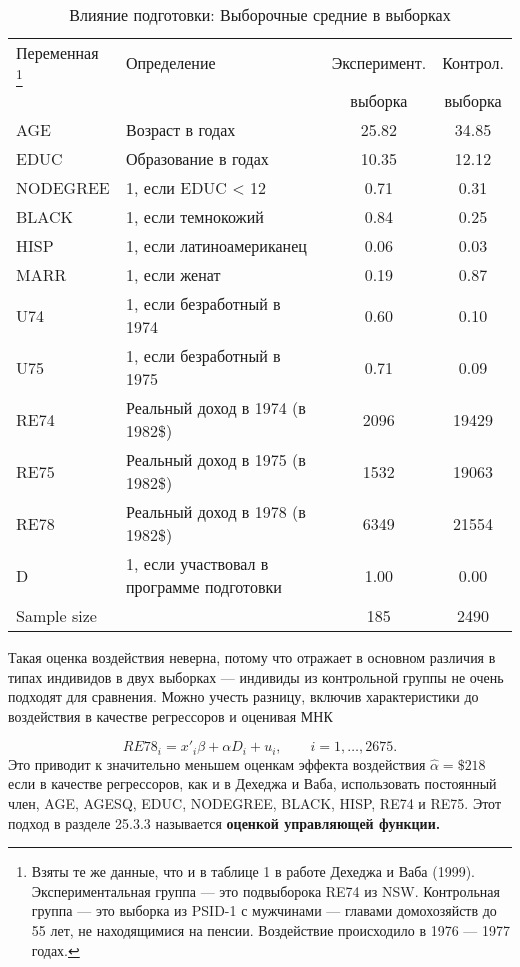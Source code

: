 \begin{table}
\caption{\label{tab: } Влияние подготовки: Выборочные средние в выборках}
\begin{minipage}{17.5cm}
\begin{center}
\begin{tabular}{llcc}
\hline
\hline
Переменная \footnote{Взяты те же данные, что и в таблице 1 в работе Дехеджа и Ваба (1999). Экспериментальная группа --- это подвыборока RE74 из NSW. Контрольная группа --- это выборка из PSID-1 с мужчинами --- главами домохозяйств до 55 лет, не находящимися на пенсии. Воздействие происходило в 1976 --- 1977 годах.} & Определение & Эксперимент. &  Контрол. \\
 & & выборка & выборка\\
\hline
AGE & Возраст в годах & 25.82 & 34.85 \\
EDUC & Образование в годах & 10.35 & 12.12 \\
NODEGREE & 1, если EDUC < 12 & 0.71 & 0.31 \\
BLACK & 1, если темнокожий & 0.84 & 0.25 \\
HISP & 1, если латиноамериканец & 0.06 & 0.03 \\
MARR & 1, если женат & 0.19 & 0.87 \\
U74 & 1, если безработный в 1974 & 0.60 & 0.10 \\
U75 & 1, если безработный в 1975 & 0.71 & 0.09 \\
RE74 & Реальный доход в 1974 (в 1982\$) & 2096 & 19429 \\
RE75 & Реальный доход в 1975 (в 1982\$) & 1532 & 19063 \\
RE78 & Реальный доход в 1978 (в 1982\$) & 6349 & 21554 \\
D & 1, если участвовал в программе подготовки & 1.00 & 0.00 \\
Sample size &  & 185 & 2490 \\
\hline
\hline
\end{tabular}
\end{center}
\end{minipage}
\end{table}

Такая оценка воздействия неверна, потому что отражает в основном различия в типах индивидов в двух выборках --- индивиды из контрольной группы не очень подходят для сравнения. Можно учесть разницу, включив характеристики до воздействия в качестве регрессоров и оценивая МНК

\begin{equation}
\label{eq25.76}
RE78_i = x'_i \beta + \alpha D_i+ u_i, \qquad i = 1, \dots, 2675. 
\end{equation}
Это приводит к значительно меньшем оценкам эффекта воздействия $\widehat{\alpha} = \$ 218$ если в качестве регрессоров, как и в Дехеджа и Ваба, использовать постоянный член, AGE, AGESQ, EDUC, NODEGREE, BLACK, HISP, RE74 и RE75. Этот подход в разделе 25.3.3 называется \bfseries оценкой управляющей функции. \mdseries 

